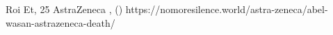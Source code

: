           {Roi Et, }
          {25}
          {AstraZeneca}
          {}
          {
            ,
             ()
          }
          {https://nomoresilence.world/astra-zeneca/abel-wasan-astrazeneca-death/}


